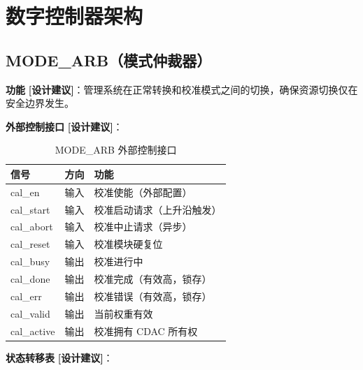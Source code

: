 \documentclass[UTF8,a4paper,11pt]{ctexart}
\newcommand{\suggested}{\textcolor{suggestblue}{\textbf{[设计建议]}}}
\begin{document}
\section{数字控制器架构}

\subsection{MODE\_ARB（模式仲裁器）}

\textbf{功能} \suggested：管理系统在正常转换和校准模式之间的切换，确保资源切换仅在安全边界发生。

\textbf{外部控制接口} \suggested：

\begin{table}[H]
\centering
\caption{MODE\_ARB 外部控制接口}
\label{tab:modearb-interface}
\begin{tabular}{lll}
\toprule
信号 & 方向 & 功能 \\
\midrule
cal\_en    & 输入 & 校准使能（外部配置） \\
cal\_start & 输入 & 校准启动请求（上升沿触发） \\
cal\_abort & 输入 & 校准中止请求（异步） \\
cal\_reset & 输入 & 校准模块硬复位 \\
cal\_busy  & 输出 & 校准进行中 \\
cal\_done  & 输出 & 校准完成（有效高，锁存） \\
cal\_err   & 输出 & 校准错误（有效高，锁存） \\
cal\_valid & 输出 & 当前权重有效 \\
cal\_active & 输出 & 校准拥有 CDAC 所有权 \\
\bottomrule
\end{tabular}
\end{table}

\textbf{状态转移表} \suggested：
\end{document}
